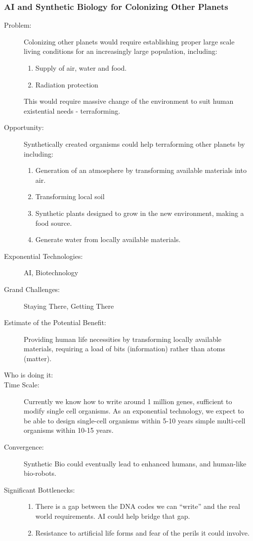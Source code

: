 \subsubsection{AI and Synthetic Biology for Colonizing Other Planets}
\label{terraform}
  \begin{description}
\item[Problem:]Colonizing other planets would  require establishing proper large scale living conditions for an  increasingly large population, including:
\hfill\begin{enumerate}
\item Supply of air, water and food.
\item Radiation protection
\end{enumerate}
 
This would require massive change of  the environment to suit human existential needs - terraforming. 
 
\item[Opportunity:]Synthetically created organisms  could help terraforming other planets 
by  including:
\hfill\begin{enumerate}
\item Generation of an atmosphere by  transforming available materials into air.
\item Transforming local soil 
\item Synthetic plants designed to grow  in the new environment, making a food source.
\item Generate water from locally  available materials. 
\end{enumerate}
 
 \item[Exponential  Technologies:] AI,  Biotechnology
  \item[Grand Challenges:] Staying There, Getting There
  \item[Estimate of the Potential  Benefit:]Providing human life necessities by transforming locally  available materials, requiring a load of bits (information) rather than  atoms (matter).
  \item[Who is doing it:]
 \item[Time Scale:] Currently we know how to write around 1 million genes,  sufficient to modify single cell organisms. As an exponential  technology, we expect to be able to design single-cell organisms within  5-10 years simple multi-cell organisms within 10-15 years. 
  \item[Convergence:] Synthetic Bio could eventually  lead to enhanced humans, and human-like bio-robots.
  \item[Significant  Bottlenecks:]
  \hfill\begin{enumerate}
  \item There is a gap between the DNA  codes we can ``write'' and the real world requirements. AI could help  bridge that gap.
  \item Resistance to artificial life  forms and fear of the perils it could involve.
  \end{enumerate}
\end{description}

